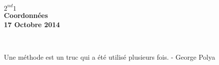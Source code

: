 \documentclass[11pt]{article}
\begin{document}

\begin{minipage}[t]{\textwidth}
  \raggedright
      {\bfseries $2^{nd}1$}\\[.35ex]
      \vspace*{-1cm}
      \raggedleft
          {\bfseries Coordonnées}\\[.35ex]
          {\bfseries 17 Octobre 2014}\\[.35ex]
\end{minipage}\\[1em]

\begin{center}
  \textsf{Une méthode est un truc qui a été utilisé plusieurs fois. - George Polya}\\
\end{center}

\setlength{\columnseprule}{1pt}
\end{document}
